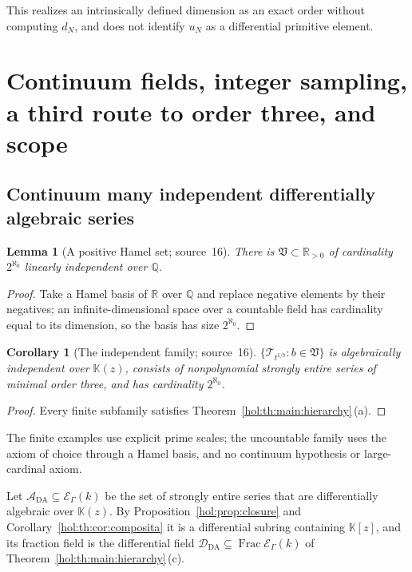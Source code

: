 \documentclass[11pt]{article}
\numberwithin{equation}{section}
\newtheorem{lemma}[theorem]{Lemma}
\newtheorem{corollary}[theorem]{Corollary}
\theoremstyle{definition}
\theoremstyle{remark}
\newcommand{\R}{\mathbb R}
\newcommand{\Q}{\mathbb Q}
\newcommand{\KK}{\mathbb K}
\newcommand{\EK}{\mathcal E_\Gamma(k)}
\newcommand{\FE}{\operatorname{Frac}\EK}
\begin{document}
This realizes an intrinsically defined dimension as an exact order without
computing $d_N$, and does not identify $u_N$ as a differential primitive
element.

\section{Continuum fields, integer sampling, a third route to order three,
and scope}\label{hol:th:sec:scope}

\subsection{Continuum many independent differentially algebraic series}
\label{hol:th:sub:continuum}

\begin{lemma}[A positive Hamel set; source~16]\label{hol:th:lem:hamel}
There is $\mathfrak V\subset\R_{>0}$ of cardinality $2^{\aleph_0}$ linearly
independent over $\Q$.
\end{lemma}

\begin{proof}
Take a Hamel basis of $\R$ over $\Q$ and replace negative elements by their
negatives; an infinite-dimensional space over a countable field has
cardinality equal to its dimension, so the basis has size $2^{\aleph_0}$.
\end{proof}

\begin{corollary}[The independent family; source~16]
\label{hol:th:cor:continuum}
$\{\mathcal T_{t^{1/b}}:b\in\mathfrak V\}$ is algebraically independent over
$\KK(z)$, consists of nonpolynomial strongly entire series of minimal order
three, and has cardinality $2^{\aleph_0}$.
\end{corollary}

\begin{proof}
Every finite subfamily satisfies Theorem~\ref{hol:th:main:hierarchy}\,(a).
\end{proof}

The finite examples use explicit prime scales; the uncountable family uses
the axiom of choice through a Hamel basis, and no continuum hypothesis or
large-cardinal axiom.

Let $\mathcal A_{\mathrm{DA}}\subseteq\EK$ be the set of strongly entire
series that are differentially algebraic over $\KK(z)$. By
Proposition~\ref{hol:prop:closure} and Corollary~\ref{hol:th:cor:composita}
it is a differential subring containing $\KK[z]$, and its fraction field is
the differential field $\mathcal D_{\mathrm{DA}}\subseteq\FE$ of
Theorem~\ref{hol:th:main:hierarchy}\,(c).
\end{document}
